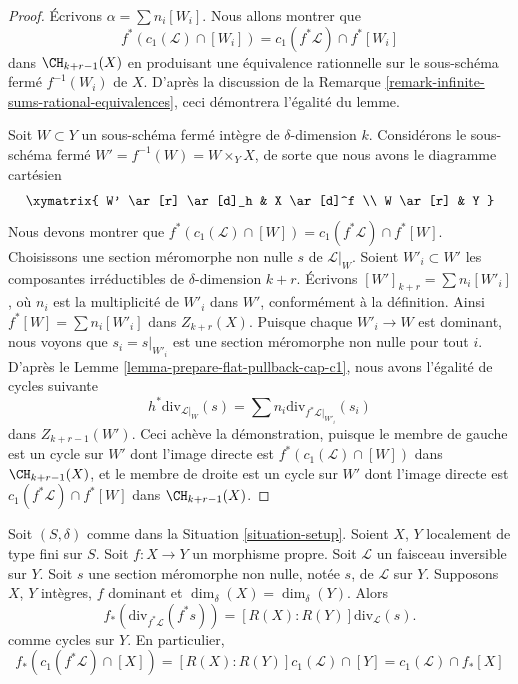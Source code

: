 \begin{proof}
Écrivons $\alpha = \sum n_i[W_i]$. Nous allons montrer que
$$
f^*(c_1(\mathcal{L}) \cap [W_i]) = c_1(f^*\mathcal{L}) \cap f^*[W_i]
$$
dans $\CH_{k + r - 1}(X)$ en produisant une équivalence rationnelle
sur le sous-schéma fermé $f^{-1}(W_i)$ de $X$.
D'après la discussion de la
Remarque \ref{remark-infinite-sums-rational-equivalences},
ceci démontrera l'égalité du lemme.

\medskip\noindent
Soit $W \subset Y$ un sous-schéma fermé intègre de $\delta$-dimension $k$.
Considérons le sous-schéma fermé $W' = f^{-1}(W) = W \times_Y X$,
de sorte que nous avons le diagramme cartésien
$$
\xymatrix{
W' \ar[r] \ar[d]_h & X \ar[d]^f \\
W \ar[r] & Y
}
$$
Nous devons montrer que
$f^*(c_1(\mathcal{L}) \cap [W]) = c_1(f^*\mathcal{L}) \cap f^*[W]$.
Choisissons une section méromorphe non nulle $s$ de $\mathcal{L}|_W$.
Soient $W'_i \subset W'$ les composantes irréductibles de
$\delta$-dimension $k + r$. Écrivons $[W']_{k + r} = \sum n_i[W'_i]$,
où $n_i$ est la multiplicité de $W'_i$ dans $W'$, conformément à la définition.
Ainsi $f^*[W] = \sum n_i[W'_i]$ dans $Z_{k + r}(X)$.
Puisque chaque $W'_i \to W$ est dominant, nous
voyons que $s_i = s|_{W'_i}$ est une section méromorphe non nulle pour
tout $i$. D'après le Lemme \ref{lemma-prepare-flat-pullback-cap-c1},
nous avons l'égalité de cycles suivante
$$
h^*\text{div}_{\mathcal{L}|_W}(s) =
\sum n_i\text{div}_{f^*\mathcal{L}|_{W'_i}}(s_i)
$$
dans $Z_{k + r - 1}(W')$. Ceci achève la démonstration, puisque
le membre de gauche est un cycle sur $W'$ dont l'image directe est
$f^*(c_1(\mathcal{L}) \cap [W])$ dans $\CH_{k + r - 1}(X)$,
et le membre de droite est un cycle sur $W'$ dont l'image directe est
$c_1(f^*\mathcal{L}) \cap f^*[W]$ dans $\CH_{k + r - 1}(X)$.
\end{proof}

\begin{lemma}
\label{lemma-equal-c1-as-cycles}
Soit $(S, \delta)$ comme dans la Situation \ref{situation-setup}.
Soient $X$, $Y$ localement de type fini sur $S$.
Soit $f : X \to Y$ un morphisme propre.
Soit $\mathcal{L}$ un faisceau inversible sur $Y$.
Soit $s$ une section méromorphe non nulle, notée $s$, de $\mathcal{L}$ sur $Y$.
Supposons $X$, $Y$ intègres, $f$ dominant et $\dim_\delta(X) = \dim_\delta(Y)$.
Alors
$$
f_*\left(\text{div}_{f^*\mathcal{L}}(f^*s)\right) =
[R(X) : R(Y)]\text{div}_\mathcal{L}(s).
$$
comme cycles sur $Y$. En particulier,
$$
f_*(c_1(f^*\mathcal{L}) \cap [X]) =
[R(X) : R(Y)] c_1(\mathcal{L}) \cap [Y] =
c_1(\mathcal{L}) \cap f_*[X]
$$
\end{lemma}

